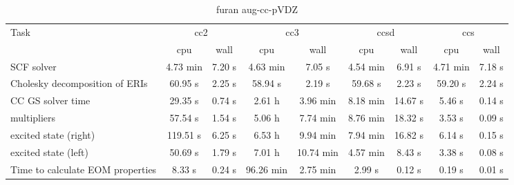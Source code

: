\documentclass{article}
\begin{document}
\begin{table}
\caption{furan aug-cc-pVDZ}
\begin{tabular}{lcccccccc}
\toprule
Task & \multicolumn{2}{c}{cc2} & \multicolumn{2}{c}{cc3} & \multicolumn{2}{c}{ccsd} & \multicolumn{2}{c}{ccs}\\
\cmidrule(lr){2-3}\cmidrule(lr){4-5}\cmidrule(lr){6-7}\cmidrule(lr){8-9}
 & cpu & wall & cpu & wall & cpu & wall & cpu & wall\\
\midrule
SCF solver & 4.73 min & 7.20 s & 4.63 min & 7.05 s & 4.54 min & 6.91 s & 4.71 min & 7.18 s\\
Cholesky decomposition of ERIs & 60.95 s & 2.25 s & 58.94 s & 2.19 s & 59.68 s & 2.23 s & 59.20 s & 2.24 s\\
CC GS solver time & 29.35 s & 0.74 s & 2.61 h & 3.96 min & 8.18 min & 14.67 s & 5.46 s & 0.14 s\\
multipliers & 57.54 s & 1.54 s & 5.06 h & 7.74 min & 8.76 min & 18.32 s & 3.53 s & 0.09 s\\
excited state (right) & 119.51 s & 6.25 s & 6.53 h & 9.94 min & 7.94 min & 16.82 s & 6.14 s & 0.15 s\\
excited state (left) & 50.69 s & 1.79 s & 7.01 h & 10.74 min & 4.57 min & 8.43 s & 3.38 s & 0.08 s\\
Time to calculate EOM properties & 8.33 s & 0.24 s & 96.26 min & 2.75 min & 2.99 s & 0.12 s & 0.19 s & 0.01 s\\
\bottomrule
\end{tabular}
\end{table}
\end{document}
